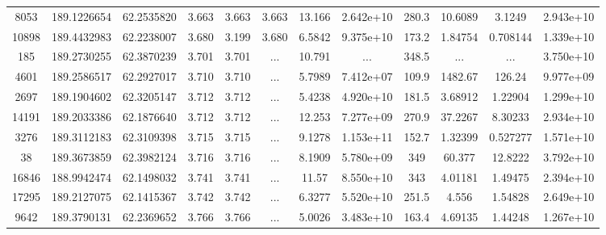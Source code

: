 \begin{table*}
\begin{tabular}{cccccccccccc}
           8053 &     189.1226654 &      62.2535820 &           3.663 &           3.663 &           3.663 &          13.166 &       2.642e+10 &           280.3 &         10.6089 &          3.1249 &       2.943e+10 \\
          10898 &     189.4432983 &      62.2238007 &           3.680 &           3.199 &           3.680 &          6.5842 &       9.375e+10 &           173.2 &         1.84754 &        0.708144 &       1.339e+10 \\
            185 &     189.2730255 &      62.3870239 &           3.701 &           3.701 &             ... &          10.791 &             ... &           348.5 &             ... &             ... &       3.750e+10 \\
           4601 &     189.2586517 &      62.2927017 &           3.710 &           3.710 &             ... &          5.7989 &       7.412e+07 &           109.9 &         1482.67 &          126.24 &       9.977e+09 \\
           2697 &     189.1904602 &      62.3205147 &           3.712 &           3.712 &             ... &          5.4238 &       4.920e+10 &           181.5 &         3.68912 &         1.22904 &       1.299e+10 \\
          14191 &     189.2033386 &      62.1876640 &           3.712 &           3.712 &             ... &          12.253 &       7.277e+09 &           270.9 &         37.2267 &         8.30233 &       2.934e+10 \\
           3276 &     189.3112183 &      62.3109398 &           3.715 &           3.715 &             ... &          9.1278 &       1.153e+11 &           152.7 &         1.32399 &        0.527277 &       1.571e+10 \\
             38 &     189.3673859 &      62.3982124 &           3.716 &           3.716 &             ... &          8.1909 &       5.780e+09 &             349 &          60.377 &         12.8222 &       3.792e+10 \\
          16846 &     188.9942474 &      62.1498032 &           3.741 &           3.741 &             ... &           11.57 &       8.550e+10 &             343 &         4.01181 &         1.49475 &       2.394e+10 \\
          17295 &     189.2127075 &      62.1415367 &           3.742 &           3.742 &             ... &          6.3277 &       5.520e+10 &           251.5 &           4.556 &         1.54828 &       2.649e+10 \\
           9642 &     189.3790131 &      62.2369652 &           3.766 &           3.766 &             ... &          5.0026 &       3.483e+10 &           163.4 &         4.69135 &         1.44248 &       1.267e+10 \\

\end{tabular}
\end{table*}
